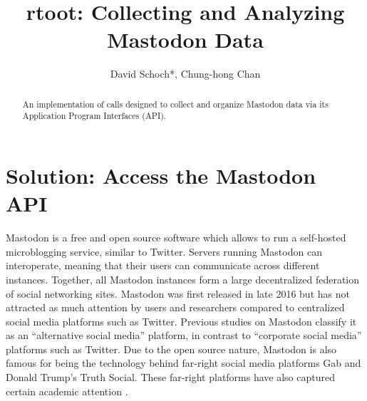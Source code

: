 \documentclass[Royal,times,sageh]{sagej}
\begin{document}

\title{rtoot: Collecting and Analyzing Mastodon Data}


\author{David Schoch*, Chung-hong Chan}




\begin{abstract}
An implementation of calls designed to collect and organize Mastodon
data via its Application Program Interfaces (API).
\end{abstract}


\maketitle

\hypertarget{solution-access-the-mastodon-api}{%
\section{Solution: Access the Mastodon
API}\label{solution-access-the-mastodon-api}}

Mastodon is a free and open source software which allows to run a
self-hosted microblogging service, similar to Twitter. Servers running
Mastodon can interoperate, meaning that their users can communicate
across different instances. Together, all Mastodon instances form a
large decentralized federation of social networking sites. Mastodon was
first released in late 2016 but has not attracted as much attention by
users and researchers compared to centralized social media platforms
such as Twitter. Previous studies on Mastodon
\citep[e.g.~][]{zulli:2020:R, la:2022:NAI} classify it as an
``alternative social media'' platform, in contrast to ``corporate social
media'' platforms such as Twitter. Due to the open source nature,
Mastodon is also famous for being the technology behind far-right social
media platforms Gab and Donald Trump's Truth Social. These far-right
platforms have also captured certain academic attention
\citep[e.g.~][]{zhou:2019:E, zannettou:2018:WG}.
\end{document}
